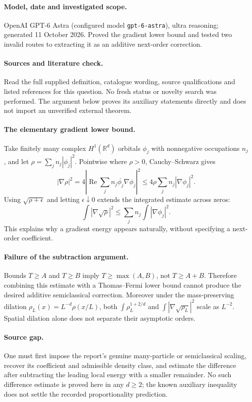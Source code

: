 \documentclass[11pt]{article}
\begin{document}
\paragraph{Model, date and investigated scope.}
OpenAI GPT-6 Astra (configured model \texttt{gpt-6-astra}), ultra reasoning; generated 11 October 2026. Proved the gradient lower bound and tested two invalid routes to extracting it as an additive next-order correction.

\paragraph{Sources and literature check.}
Read the full supplied definition, catalogue wording, source qualifications and listed references for this question. No fresh status or novelty search was performed. The argument below proves its auxiliary statements directly and does not import an unverified external theorem.

\paragraph{The elementary gradient lower bound.} Take finitely many complex \(H^1(\mathbb R^d)\) orbitals \(\phi_j\) with nonnegative occupations \(n_j\), and let \(\rho=\sum_j n_j|\phi_j|^2\). Pointwise where \(\rho>0\), Cauchy--Schwarz gives
\[
 |\nabla\rho|^2
 =4\left|\operatorname{Re}\sum_j n_j\overline{\phi_j}\nabla\phi_j\right|^2
 \leq4\rho\sum_jn_j|\nabla\phi_j|^2.
\]
Using \(\sqrt{\rho+\epsilon}\) and letting \(\epsilon\downarrow0\) extends the integrated estimate across zeros:
\[
 \int|\nabla\sqrt\rho|^2\leq\sum_jn_j\int|\nabla\phi_j|^2.
\]
This explains why a gradient energy appears naturally, without specifying a next-order coefficient.
\paragraph{Failure of the subtraction argument.} Bounds \(T\geq A\) and \(T\geq B\) imply \(T\geq\max(A,B)\), not \(T\geq A+B\). Therefore combining this estimate with a Thomas--Fermi lower bound cannot produce the desired additive semiclassical correction. Moreover under the mass-preserving dilation \(\rho_L(x)=L^{-d}\rho(x/L)\), both \(\int\rho_L^{1+2/d}\) and \(\int|\nabla\sqrt{\rho_L}|^2\) scale as \(L^{-2}\). Spatial dilation alone does not separate their asymptotic orders.
\paragraph{Source gap.} One must first impose the report's genuine many-particle or semiclassical scaling, recover its coefficient and admissible density class, and estimate the difference after subtracting the leading local energy with a smaller remainder. No such difference estimate is proved here in any \(d\geq2\); the known auxiliary inequality does not settle the recorded proportionality prediction.
\end{document}
